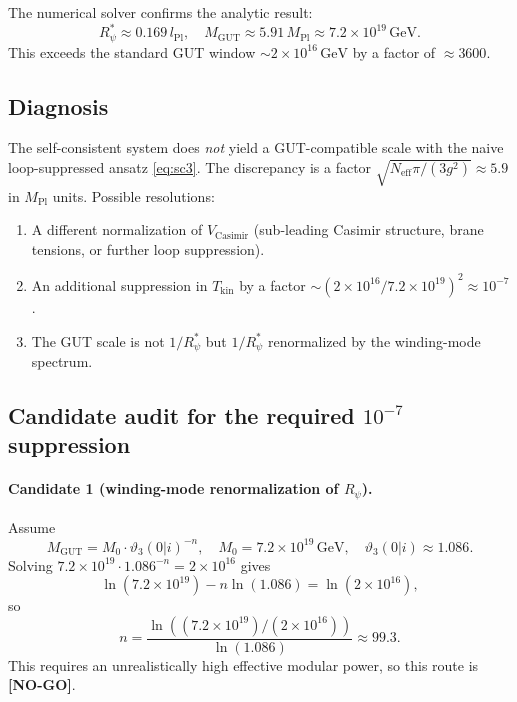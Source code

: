 \documentclass[12pt,a4paper]{article}
\theoremstyle{remark}
\begin{document}
The numerical solver confirms the analytic result:
\[
R_\psi^* \approx 0.169\,l_{\mathrm{Pl}},
\quad
M_{\mathrm{GUT}} \approx 5.91\,M_{\mathrm{Pl}} \approx 7.2\times10^{19}\,\mathrm{GeV}.
\]
This exceeds the standard GUT window $\sim2\times10^{16}\,\mathrm{GeV}$ by a
factor of $\approx3600$.

\subsection*{Diagnosis}

The self-consistent system does \emph{not} yield a GUT-compatible scale with
the naive loop-suppressed ansatz \eqref{eq:sc3}.  The discrepancy is a factor
$\sqrt{N_{\mathrm{eff}}\pi/(3g^2)}\approx5.9$ in $M_{\mathrm{Pl}}$ units.
Possible resolutions:
\begin{enumerate}
  \item A different normalization of $V_{\mathrm{Casimir}}$ (sub-leading
    Casimir structure, brane tensions, or further loop suppression).
  \item An additional suppression in $T_{\mathrm{kin}}$ by a factor
    $\sim(2\times10^{16}/7.2\times10^{19})^2\approx10^{-7}$.
  \item The GUT scale is not $1/R_\psi^*$ but $1/R_\psi^*$ renormalized by
    the winding-mode spectrum.
\end{enumerate}

\subsection*{Candidate audit for the required $10^{-7}$ suppression}

\paragraph{Candidate 1 (winding-mode renormalization of $R_\psi$).}
Assume
\[
M_{\mathrm{GUT}}=M_0\cdot \vartheta_3(0|i)^{-n},
\quad
M_0=7.2\times10^{19}\,\mathrm{GeV},
\quad
\vartheta_3(0|i)\approx1.086.
\]
Solving
\(
7.2\times10^{19}\cdot1.086^{-n}=2\times10^{16}
\)
gives
\[
\ln(7.2\times10^{19})-n\ln(1.086)=\ln(2\times10^{16}),
\]
so
\[
n=\frac{\ln\!\left((7.2\times10^{19})/(2\times10^{16})\right)}{\ln(1.086)}\approx 99.3.
\]
This requires an unrealistically high effective modular power, so this route is
\textbf{[NO-GO]}.
\end{document}
